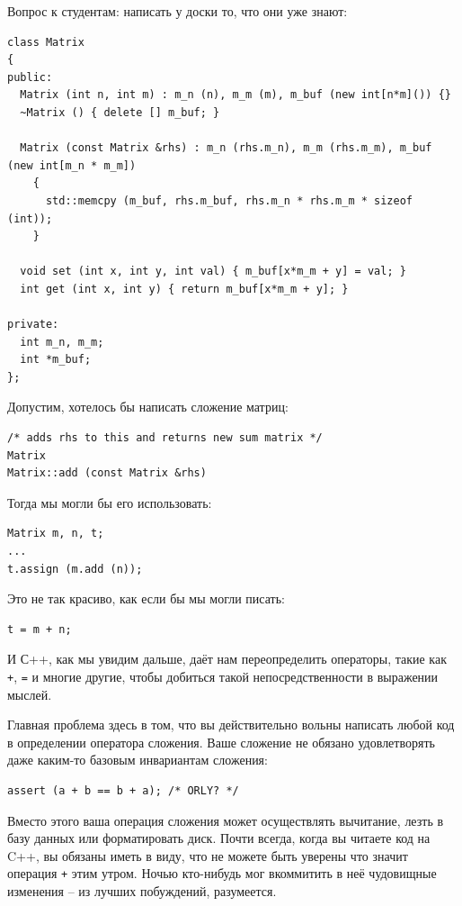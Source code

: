\documentclass[a4paper,12pt,oneside]{article}
\begin{document}
Вопрос к студентам: написать у доски то, что они уже знают:

\begin{lstlisting}
class Matrix
{
public:
  Matrix (int n, int m) : m_n (n), m_m (m), m_buf (new int[n*m]()) {}
  ~Matrix () { delete [] m_buf; }

  Matrix (const Matrix &rhs) : m_n (rhs.m_n), m_m (rhs.m_m), m_buf (new int[m_n * m_m])
    {
      std::memcpy (m_buf, rhs.m_buf, rhs.m_n * rhs.m_m * sizeof (int));
    }

  void set (int x, int y, int val) { m_buf[x*m_m + y] = val; }
  int get (int x, int y) { return m_buf[x*m_m + y]; }

private:
  int m_n, m_m;
  int *m_buf;
};
\end{lstlisting}

Допустим, хотелось бы написать сложение матриц:

\begin{lstlisting}
/* adds rhs to this and returns new sum matrix */
Matrix
Matrix::add (const Matrix &rhs)
\end{lstlisting}

Тогда мы могли бы его использовать:

\begin{lstlisting}
Matrix m, n, t;
...
t.assign (m.add (n));
\end{lstlisting}

Это не так красиво, как если бы мы могли писать:

\begin{lstlisting}
t = m + n;
\end{lstlisting}

И С++, как мы увидим дальше, даёт нам переопределить операторы, такие как \lstinline!+!, \lstinline!=! и многие другие, чтобы добиться такой непосредственности в выражении мыслей.

Главная проблема здесь в том, что вы действительно вольны написать любой код в определении оператора сложения. Ваше сложение не обязано удовлетворять даже каким-то базовым инвариантам сложения:

\begin{lstlisting}
assert (a + b == b + a); /* ORLY? */
\end{lstlisting}

Вместо этого ваша операция сложения может осуществлять вычитание, лезть в базу данных или форматировать диск. Почти всегда, когда вы читаете код на C++, вы обязаны иметь в виду, что не можете быть уверены что значит операция \lstinline!+! этим утром. Ночью кто-нибудь мог вкоммитить в неё чудовищные изменения – из лучших побуждений, разумеется.
\end{document}
